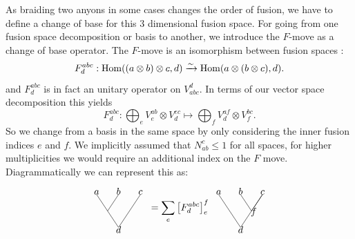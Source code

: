 \documentclass{article}
\begin{document}
As braiding two anyons in some cases changes the order of fusion, we have to define a change of base for this $3$ dimensional fusion space.
For going from one fusion space decomposition or basis to another, we introduce the $F$-move as a change of base operator. The $F$-move is an isomorphism between fusion spaces \cite{lin_tensor_2020}:
\[
  F^{abc}_{d} : \operatorname{Hom}((a \otimes b) \otimes c, d) \xrightarrow{\sim}  \operatorname{Hom}(a \otimes (b \otimes c), d). 
\]  
and $F^{abc}_{d}$ is in fact an unitary operator on $V_{abc}^d$.
In terms of our vector space decomposition this yields
\[
  F^{abc}_{d} : \bigoplus_{e} V_{e}^{ab} \otimes V_{d}^{ec} \mapsto \bigoplus_{f} V_{d}^{af} \otimes V_{f}^{bc}.
\]  
So we change from a basis in the same space by only considering the inner fusion indices $e$ and $f$. We implicitly assumed that $N_{ab}^{c} \leq 1$ for all spaces, for higher multiplicities we would require an additional index on the $F$ move.
Diagrammatically we can represent this as:
\[
\begin{tikzpicture}[baseline={(current bounding box.center)}, scale=0.8]
  \node at (0,0.1) (a) {$a$};
  \node at (1,0.15) (b) {$b$};
  \node at (2,0.1) (c) {$c$};
  \node at (0.5,-1) (ab) {};
  \node at (1,-1.6) (d) {$d$};
  \draw [-] plot coordinates {(0.0,0.0) (1.0,-1.5)};
  \draw [-] plot coordinates {(1.0,0.0) (0.5,-0.75)};
  \draw [-] plot coordinates {(2.0,0.0) (1.0,-1.5)};
\end{tikzpicture}
\; = \sum_{e} \left[ F_{d}^{abc}\right]_{e}^{f} \;
\begin{tikzpicture}[baseline={(current bounding box.center)}, scale=0.8]
  \node at (0,0.1) (a) {$a$};
  \node at (1,0.15) (b) {$b$};
  \node at (2,0.1) (c) {$c$};
  \node at (1.6,-0.8) (bc) {$f$};
  \node at (1,-1.6) (d) {$d$};
  \draw [-] plot coordinates {(1.0,0.0) (1.5,-0.75)};
  \draw [-] plot coordinates {(2.0,0.0) (1.5,-0.75)};
  \draw [-] plot coordinates {(2.0,0.0) (1,-1.5)};
  \draw [-] plot coordinates {(0.0,0.0) (1,-1.5)};
\end{tikzpicture}
\]
\end{document}
